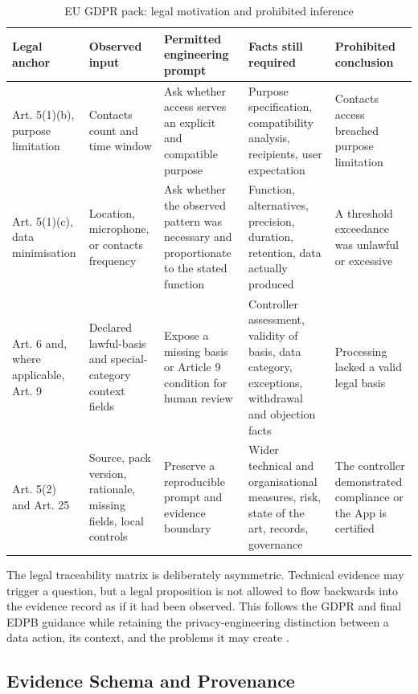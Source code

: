 \begin{table}[H]
\centering
\caption{EU GDPR pack: legal motivation and prohibited inference}
\label{tab:legal-traceability}
\scriptsize
\begin{tabular}{>{\raggedright\arraybackslash}p{}>{\raggedright\arraybackslash}p{}>{\raggedright\arraybackslash}p{}>{\raggedright\arraybackslash}p{}>{\raggedright\arraybackslash}p{}}
\toprule
Legal anchor & Observed input & Permitted engineering prompt & Facts still required & Prohibited conclusion \\
\midrule
Art. 5(1)(b), purpose limitation & Contacts count and time window & Ask whether access serves an explicit and compatible purpose & Purpose specification, compatibility analysis, recipients, user expectation & Contacts access breached purpose limitation \\
Art. 5(1)(c), data minimisation & Location, microphone, or contacts frequency & Ask whether the observed pattern was necessary and proportionate to the stated function & Function, alternatives, precision, duration, retention, data actually produced & A threshold exceedance was unlawful or excessive \\
Art. 6 and, where applicable, Art. 9 & Declared lawful-basis and special-category context fields & Expose a missing basis or Article 9 condition for human review & Controller assessment, validity of basis, data category, exceptions, withdrawal and objection facts & Processing lacked a valid legal basis \\
Art. 5(2) and Art. 25 & Source, pack version, rationale, missing fields, local controls & Preserve a reproducible prompt and evidence boundary & Wider technical and organisational measures, risk, state of the art, records, governance & The controller demonstrated compliance or the App is certified \\
\bottomrule
\end{tabular}
\end{table}

The legal traceability matrix is deliberately asymmetric. Technical evidence may trigger a question, but a legal proposition is not allowed to flow backwards into the evidence record as if it had been observed. This follows the GDPR and final EDPB guidance while retaining the privacy-engineering distinction between a data action, its context, and the problems it may create \cite{gdpr2016,edpbArticle25,nist8062}.

\subsection{Evidence Schema and Provenance}

